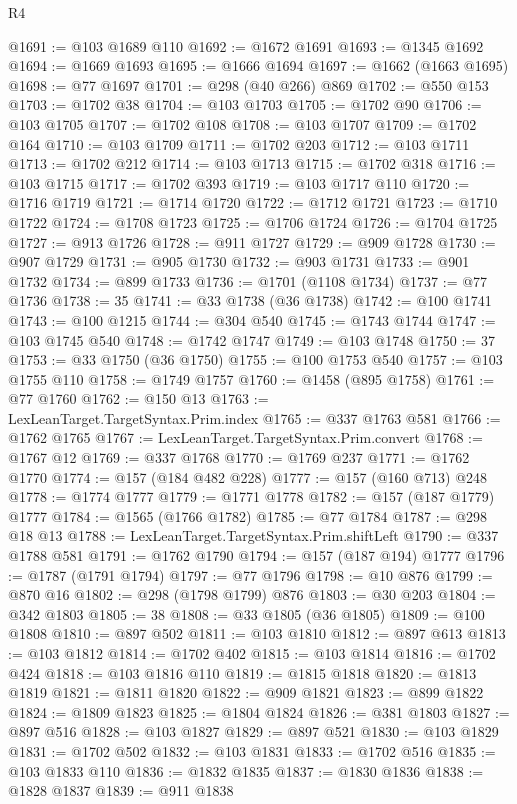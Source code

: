 \begin{lexlean}{R4}
\begin{coremodule}
@1691 := @103 @1689 @110
@1692 := @1672 @1691
@1693 := @1345 @1692
@1694 := @1669 @1693
@1695 := @1666 @1694
@1697 := @1662 (@1663 @1695)
@1698 := @77 @1697
@1701 := @298 (@40 @266) @869
@1702 := @550 @153
@1703 := @1702 @38
@1704 := @103 @1703
@1705 := @1702 @90
@1706 := @103 @1705
@1707 := @1702 @108
@1708 := @103 @1707
@1709 := @1702 @164
@1710 := @103 @1709
@1711 := @1702 @203
@1712 := @103 @1711
@1713 := @1702 @212
@1714 := @103 @1713
@1715 := @1702 @318
@1716 := @103 @1715
@1717 := @1702 @393
@1719 := @103 @1717 @110
@1720 := @1716 @1719
@1721 := @1714 @1720
@1722 := @1712 @1721
@1723 := @1710 @1722
@1724 := @1708 @1723
@1725 := @1706 @1724
@1726 := @1704 @1725
@1727 := @913 @1726
@1728 := @911 @1727
@1729 := @909 @1728
@1730 := @907 @1729
@1731 := @905 @1730
@1732 := @903 @1731
@1733 := @901 @1732
@1734 := @899 @1733
@1736 := @1701 (@1108 @1734)
@1737 := @77 @1736
@1738 := 35
@1741 := @33 @1738 (@36 @1738)
@1742 := @100 @1741
@1743 := @100 @1215
@1744 := @304 @540
@1745 := @1743 @1744
@1747 := @103 @1745 @540
@1748 := @1742 @1747
@1749 := @103 @1748
@1750 := 37
@1753 := @33 @1750 (@36 @1750)
@1755 := @100 @1753 @540
@1757 := @103 @1755 @110
@1758 := @1749 @1757
@1760 := @1458 (@895 @1758)
@1761 := @77 @1760
@1762 := @150 @13
@1763 := LexLeanTarget.TargetSyntax.Prim.index
@1765 := @337 @1763 @581
@1766 := @1762 @1765
@1767 := LexLeanTarget.TargetSyntax.Prim.convert
@1768 := @1767 @12
@1769 := @337 @1768
@1770 := @1769 @237
@1771 := @1762 @1770
@1774 := @157 (@184 @482 @228)
@1777 := @157 (@160 @713) @248
@1778 := @1774 @1777
@1779 := @1771 @1778
@1782 := @157 (@187 @1779) @1777
@1784 := @1565 (@1766 @1782)
@1785 := @77 @1784
@1787 := @298 @18 @13
@1788 := LexLeanTarget.TargetSyntax.Prim.shiftLeft
@1790 := @337 @1788 @581
@1791 := @1762 @1790
@1794 := @157 (@187 @194) @1777
@1796 := @1787 (@1791 @1794)
@1797 := @77 @1796
@1798 := @10 @876
@1799 := @870 @16
@1802 := @298 (@1798 @1799) @876
@1803 := @30 @203
@1804 := @342 @1803
@1805 := 38
@1808 := @33 @1805 (@36 @1805)
@1809 := @100 @1808
@1810 := @897 @502
@1811 := @103 @1810
@1812 := @897 @613
@1813 := @103 @1812
@1814 := @1702 @402
@1815 := @103 @1814
@1816 := @1702 @424
@1818 := @103 @1816 @110
@1819 := @1815 @1818
@1820 := @1813 @1819
@1821 := @1811 @1820
@1822 := @909 @1821
@1823 := @899 @1822
@1824 := @1809 @1823
@1825 := @1804 @1824
@1826 := @381 @1803
@1827 := @897 @516
@1828 := @103 @1827
@1829 := @897 @521
@1830 := @103 @1829
@1831 := @1702 @502
@1832 := @103 @1831
@1833 := @1702 @516
@1835 := @103 @1833 @110
@1836 := @1832 @1835
@1837 := @1830 @1836
@1838 := @1828 @1837
@1839 := @911 @1838

\end{coremodule}
\end{lexlean}
